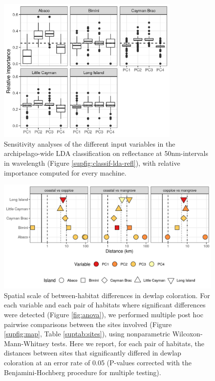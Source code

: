 \begin{figure}[H]
	\centering
	\includegraphics[width=0.8\textwidth]{"../analyses/04-machine learning/plots/importance_lda_pca"}
	\caption{Sensitivity analyses of the different input variables in the archipelago-wide LDA classification on reflectance at 50nm-intervals in wavelength (Figure \ref{supfig:classif-lda-refl}), with relative importance computed for every machine.}
	\label{supfig:importance-lda-refl}
\end{figure}

\begin{figure}[H]
	\centering
	\includegraphics[width=\textwidth]{"../analyses/10-distances/figure_distances2"}
	\caption{Spatial scale of between-habitat differences in dewlap coloration. For each variable and each pair of habitats where significant differences were detected (Figure \ref{fig:anova}), we performed multiple post hoc pairwise comparisons between the sites involved (Figure \ref{supfig:map}, Table \ref{suptab:sites}), using nonparametric Wilcoxon-Mann-Whitney tests. Here we report, for each pair of habitats, the distances between sites that significantly differed in dewlap coloration at an error rate of 0.05 (P-values corrected with the Benjamini-Hochberg procedure for multiple testing).}
	\label{supfig:distances}
\end{figure}

